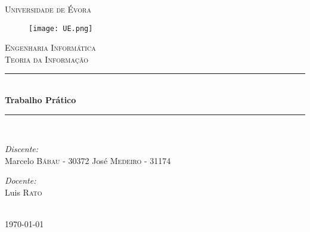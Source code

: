 \documentclass[12pt]{article}
\begin{document}
\begin{titlepage}

\newcommand{\HRule}{\rule{\linewidth}{0.5mm}} 

\center
 
\textsc{\LARGE Universidade de Évora}\\[1.5cm]
\begin{figure}[ht!]
\centering
\texttt{[image: UE.png]}
\label{overflow}
\end{figure}
\indent \indent
\textsc{\Large Engenharia Informática}\\[0.5cm]
\textsc{\large Teoria da Informação}\\[0.5cm]


\HRule \\[0.4cm]
{ \huge \bfseries Trabalho Prático}\\[0.4cm] %
\HRule \\[1.5cm]
 

\begin{minipage}{0.4\textwidth}
\begin{flushleft} \large
\emph{Discente:}\\
Marcelo \textsc{Bábau} - 30372
José \textsc{Medeiro} - 31174
\end{flushleft}
\end{minipage}
\begin{minipage}{0.4\textwidth}
\begin{flushright} \large
\emph{Docente:} \\
Luis \textsc{Rato} \\  
\end{flushright}
\end{minipage}\\[4cm]


{\large \today}\\[3cm] %

\vfill %

\end{titlepage}
\end{document}
